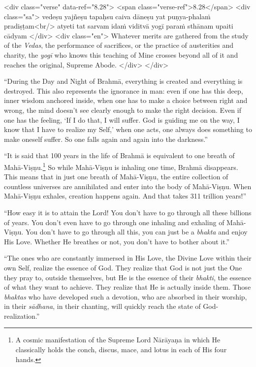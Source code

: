 \begin{html}
<div class="verse" data-ref="8.28">
  <span class="verse-ref">8.28</span>
  <div class="sa">
    vedeṣu yajñeṣu tapaḥsu caiva dāneṣu yat puṇya-phalaṁ pradiṣṭam<br/>
    atyeti tat sarvam idaṁ viditvā yogī paraṁ sthānam upaiti cādyam
  </div>
  <div class="en">
    Whatever merits are gathered from the study of the \textit{Vedas}, the performance of sacrifices, or the practice of austerities and charity, the \textit{yogī} who knows this teaching of Mine crosses beyond all of it and reaches the original, Supreme Abode.
  </div>
</div>
\end{html}


\enquote{During the Day and Night of Brahmā, everything is created and everything is destroyed. This also represents the ignorance in man: even if one has this deep, inner wisdom anchored inside, when one has to make a choice between right and wrong, the mind doesn’t see clearly enough to make the right decision. Even if one has the feeling, \enquote{If I do that, I will suffer. God is guiding me on the way, I know that I have to realize my Self,} when one acts, one always does something to make oneself suffer. So one falls again and again into the darkness.}

\enquote{It is said that 100 years in the life of Brahmā is equivalent to one breath of Mahā-Viṣṇu.\footnote{A cosmic manifestation of the Supreme Lord Nārāyaṇa in which He classically holds the conch, discus, mace, and lotus in each of His four hands.} So while Mahā-Viṣṇu is inhaling one time, Brahmā disappears. This means that in just one breath of Mahā-Viṣṇu, the entire collection of countless universes are annihilated and enter into the body of Mahā-Viṣṇu. When Mahā-Viṣṇu exhales, creation happens again. And that takes 311 trillion years!}

\enquote{How easy it is to attain the Lord! You don’t have to go through all these billions of years. You don’t even have to go through one inhaling and exhaling of Mahā-Viṣṇu. You don’t have to go through all this, you can just be a \textit{bhakta} and enjoy His Love. Whether He breathes or not, you don’t have to bother about it.}

\enquote{The ones who are constantly immersed in His Love, the Divine Love within their own Self, realize the essence of God. They realize that God is not just the One they pray to, outside themselves, but He is the essence of their \textit{bhakti}, the essence of what they want to achieve. They realize that He is actually inside them. Those \textit{bhaktas} who have developed such a devotion, who are absorbed in their worship, in their \textit{sādhana}, in their chanting, will quickly reach the state of God-realization.}

